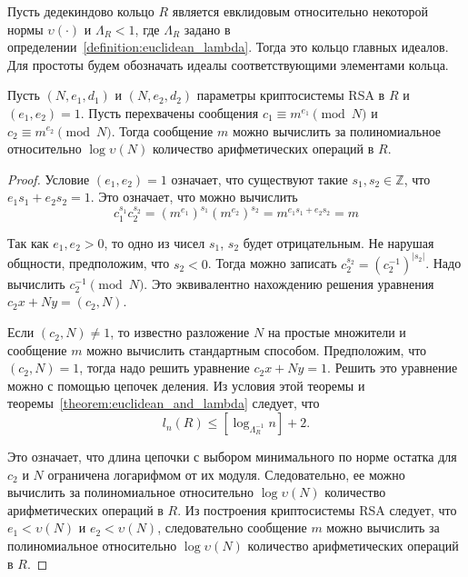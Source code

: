 \documentclass[_00_dissertation.tex]{subfiles}
\begin{document}
\begin{theorem}
    Пусть дедекиндово кольцо $R$ является евклидовым относительно некоторой нормы $\upsilon(\cdot)$ и $\Lambda_{R} < 1$, где $\Lambda_{R}$ задано в определении~\ref{definition:euclidean_lambda}.
    Тогда это кольцо главных идеалов.
    Для простоты будем обозначать идеалы соответствующими элементами кольца.

    Пусть $(N, e_1, d_1)$ и $(N, e_2, d_2)$ параметры криптосистемы RSA в $R$ и $(e_1, e_2) = 1$.
    Пусть перехвачены сообщения $c_1 \equiv m^{e_1} \pmod{N}$ и $c_2 \equiv m^{e_2} \pmod{N}$.
    Тогда сообщение $m$ можно вычислить за полиномиальное относительно $\log \upsilon(N)$ количество арифметических операций в $R$.
\end{theorem}
\begin{proof}
    Условие $(e_1, e_2) = 1$ означает, что существуют такие $s_1, s_2 \in \mathbb{Z}$, что $e_1 s_1 + e_2 s_2 = 1$.
    Это означает, что можно вычислить
    \begin{equation*}
        c_1^{s_1}c_2^{s_2} = (m^{e_1})^{s_1} (m^{e_2})^{s_2} = m^{e_1 s_1 + e_2 s_2} = m
    \end{equation*}

    Так как $e_1, e_2 > 0$, то одно из чисел $s_1$, $s_2$ будет отрицательным.
    Не нарушая общности, предположим, что $s_2 < 0$.
    Тогда можно записать $c_2^{s_2} = (c_2^{-1})^{|s_2|}$.
    Надо вычислить $c_2^{-1} \pmod{N}$.
    Это эквивалентно нахождению решения уравнения $c_2 x + N y = (c_2, N)$.

    Если $(c_2, N) \neq 1$, то известно разложение $N$ на простые множители и сообщение $m$ можно вычислить стандартным способом.
    Предположим, что $(c_2, N) = 1$, тогда надо решить уравнение $c_2 x + N y = 1$.
    Решить это уравнение можно с помощью цепочек деления.
    Из условия этой теоремы и теоремы~\ref{theorem:euclidean_and_lambda} следует, что
    \begin{equation*}
        l_{n}(R) \le \left[
            \log_{\Lambda_{R}^{-1}} n
        \right] + 2.
    \end{equation*}

    Это означает, что длина цепочки с выбором минимального по норме остатка для $c_2$ и $N$ ограничена логарифмом от их модуля.
    Следовательно, ее можно вычислить за полиномиальное относительно $\log \upsilon(N)$ количество арифметических операций в $R$.
    Из построения криптосистемы RSA следует, что $e_1 < \upsilon(N)$ и $e_2 < \upsilon(N)$, следовательно сообщение $m$ можно вычислить за полиномиальное относительно $\log \upsilon(N)$ количество арифметических операций в $R$.
\end{proof}
\end{document}
